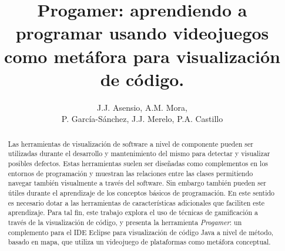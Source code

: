 \documentclass{llncs}
\begin{document}

\title{Progamer: aprendiendo a programar usando videojuegos como metáfora para visualización de código.}


\author{J.J. Asensio, A.M. Mora, \\P. García-Sánchez, J.J. Merelo, P.A. Castillo}

\maketitle
%
%
\begin{abstract} 
Las herramientas de visualización de software a nivel de componente
pueden ser utilizadas durante el desarrollo y mantenimiento del mismo
para detectar y visualizar posibles defectos. Estas herramientas
suelen ser diseñadas como complementos en los entornos de programación y
muestran las relaciones entre las clases permitiendo navegar también
visualmente a través del software. Sin embargo también pueden ser
útiles durante el aprendizaje de los conceptos básicos de
programación. En este sentido es necesario dotar a las herramientas de
características adicionales que faciliten este aprendizaje. Para tal
fin, este trabajo explora el uso de técnicas de gamificación a través de la visualización de código, y presenta la herramienta \emph{Progamer}: un
complemento para el IDE Eclipse para visualización de código Java a nivel de método,
basado en mapa, que utiliza un videojuego de plataformas como metáfora conceptual.
\end{abstract}


%
%
\end{document}
